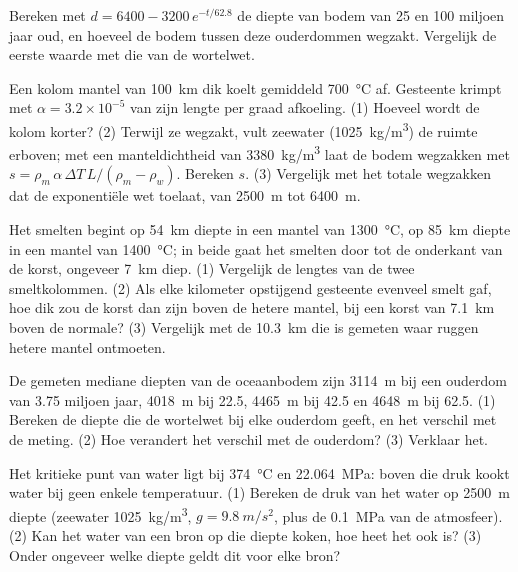 \begin{exercise}[$\star\star$]\label{exo:g11:ocean-ridges:11}
Bereken met $d = 6400 - 3200\,e^{-t/62.8}$ de diepte van bodem van 25 en 100
miljoen jaar oud, en hoeveel de bodem tussen deze ouderdommen wegzakt. Vergelijk
de eerste waarde met die van de wortelwet.
\end{exercise}

\begin{exercise}[$\star\star\star$]\label{exo:g11:ocean-ridges:12}
Een kolom mantel van \qty{100}{km} dik koelt gemiddeld \qty{700}{\celsius} af.
Gesteente krimpt met $\alpha = 3.2 \times 10^{-5}$ van zijn lengte per
graad afkoeling. (1) Hoeveel wordt de kolom korter? (2) Terwijl ze
wegzakt, vult zeewater (\qty{1025}{kg/m^3}) de ruimte erboven; met een
manteldichtheid van \qty{3380}{kg/m^3} laat  de bodem wegzakken met
$s = \rho_m\,\alpha\,\Delta T\,L/(\rho_m - \rho_w)$. Bereken $s$. (3) Vergelijk
met het totale wegzakken dat de exponentiële wet toelaat, van \qty{2500}{m} tot
\qty{6400}{m}.
\end{exercise}

\begin{exercise}[$\star\star\star$]\label{exo:g11:ocean-ridges:13}
Het smelten begint op \qty{54}{km} diepte in een mantel van \qty{1300}{\celsius},
op \qty{85}{km} diepte in een mantel van \qty{1400}{\celsius}; in beide gaat het
smelten door tot de onderkant van de korst, ongeveer \qty{7}{km} diep. (1) Vergelijk
de lengtes van de twee smeltkolommen. (2) Als elke kilometer opstijgend gesteente
evenveel smelt gaf, hoe dik zou de korst dan zijn boven de hetere mantel, bij een
korst van \qty{7.1}{km} boven de normale? (3) Vergelijk met de \qty{10.3}{km}
die is gemeten waar ruggen hetere mantel ontmoeten.
\end{exercise}

\begin{exercise}[$\star\star\star$]\label{exo:g11:ocean-ridges:14}
De gemeten mediane diepten van de oceaanbodem zijn \qty{3114}{m} bij een ouderdom van
\num{3.75} miljoen jaar, \qty{4018}{m} bij \num{22.5}, \qty{4465}{m} bij
\num{42.5} en \qty{4648}{m} bij \num{62.5}. (1) Bereken de diepte die de
wortelwet bij elke ouderdom geeft, en het verschil met de meting. (2)
Hoe verandert het verschil met de ouderdom? (3) Verklaar het.
\end{exercise}

\begin{exercise}[$\star\star\star$]\label{exo:g11:ocean-ridges:15}
Het kritieke punt van water ligt bij \qty{374}{\celsius} en \qty{22.064}{MPa}: boven
die druk kookt water bij geen enkele temperatuur. (1) Bereken de
druk van het water op \qty{2500}{m} diepte (zeewater \qty{1025}{kg/m^3},
$g = \qty{9.8}{m/s^2}$, plus de \qty{0.1}{MPa} van de atmosfeer). (2) Kan het
water van een bron op die diepte koken, hoe heet het ook is? (3) Onder ongeveer welke
diepte geldt dit voor elke bron?
\end{exercise}

